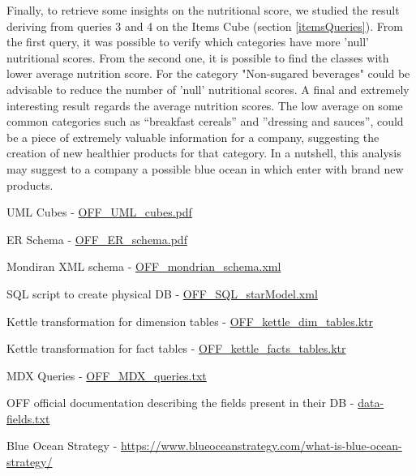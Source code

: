 \documentclass[runningheads]{llncs}
\begin{document}
Finally, to retrieve some insights on the nutritional score, we studied the result deriving from queries 3 and 4 on the Items Cube (section \ref{itemsQueries}). From the first query, it was possible to verify which categories have more 'null' nutritional scores. From the second one, it is possible to find the classes with lower average nutrition score. For the category "Non-sugared beverages" could be advisable to reduce the number of 'null' nutritional scores. A final and extremely interesting result regards the average nutrition scores. The low average on some common categories such as “breakfast cereals” and ”dressing and sauces”, could be a piece of extremely valuable information for a company, suggesting the creation of new healthier products for that category. In a nutshell, this analysis may suggest to a company a possible blue ocean \cite{Blue_ocean} in which enter with brand new products.


\begin{thebibliography}{8}

UML Cubes - \href{https://github.com/leomandru/Open-Food-Facts-multidimensional-model/blob/main/EDD-project/OFF_UML_cubes.pdf}{OFF\_UML\_cubes.pdf}

ER Schema - \href{https://github.com/leomandru/Open-Food-Facts-multidimensional-model/blob/main/EDD-project/OFF_ER_schema.pdf}{OFF\_ER\_schema.pdf}

Mondiran XML schema - \href{https://github.com/leomandru/Open-Food-Facts-multidimensional-model/blob/main/EDD-project/OFF_mondrian_schema.xml}{OFF\_mondrian\_schema.xml}

SQL script to create physical DB - \href{https://github.com/leomandru/Open-Food-Facts-multidimensional-model/blob/main/EDD-project/OFF_SQL_starModel.sql}{OFF\_SQL\_starModel.xml}

Kettle transformation for dimension tables - \href{https://github.com/leomandru/Open-Food-Facts-multidimensional-model/blob/main/EDD-project/OFF_kettle_dim_tables.ktr}{OFF\_kettle\_dim\_tables.ktr}

Kettle transformation for fact tables - \href{https://github.com/leomandru/Open-Food-Facts-multidimensional-model/blob/main/EDD-project/OFF_kettle_facts_tables.ktr}{OFF\_kettle\_facts\_tables.ktr}

MDX Queries - \href{https://github.com/leomandru/Open-Food-Facts-multidimensional-model/blob/main/EDD-project/OFF_MDX_queries.txt}{OFF\_MDX\_queries.txt}

OFF official documentation describing the fields present in their DB - \href{https://static.openfoodfacts.org/data/data-fields.txt}{data-fields.txt}

Blue Ocean Strategy - \url{https://www.blueoceanstrategy.com/what-is-blue-ocean-strategy/}

\end{thebibliography}

%
%
%
\end{document}

